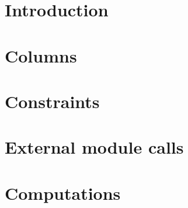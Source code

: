 

\section{Introduction}             \label{mxp: intro}                       
\section{Columns}                  \label{mxp: columns}                     
\section{Constraints}              \label{mxp: constraints}                 
\section{External module calls}    \label{mxp: calls}                       
\section{Computations}             \label{mxp: computations}                
